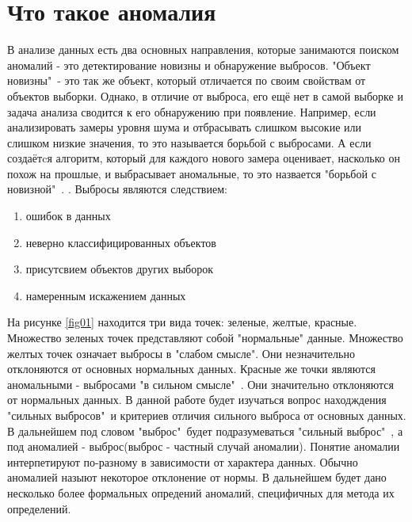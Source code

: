 \section{Что такое аномалия}
В анализе данных есть два основных направления, которые занимаются поиском аномалий - это детектирование новизны и обнаружение выбросов. "Объект новизны"\ - это так же объект, который отличается по своим свойствам от объектов  выборки. Однако, в отличие от выброса,  его ещё нет в самой выборке и задача анализа сводится к его обнаружению при появление. Например, если анализировать замеры уровня шума и отбрасывать слишком высокие или слишком низкие значения, то это называется борьбой с выбросами. А если  создаётcя алгоритм, который для каждого нового замера оценивает, насколько он похож на прошлые, и выбрасывает аномальные, то это  назвается "борьбой с новизной"\ .
\cite{Book01}.
Выбросы являются следствием:
\begin{enumerate}
	\item ошибок в данных
	\item неверно классифицированных объектов
	\item присутсвием объектов других выборок
	\item намеренным искажением данных
\end{enumerate}
На рисунке \ref{fig01} находится три вида точек: зеленые, желтые, красные. Множество зеленых точек представляют собой "нормальные" данные. Множество желтых точек означает  выбросы в "слабом смысле". Они незначительно отклоняются от основных  нормальных данных. Красные же точки являются аномальными - выбросами "в сильном смысле"\ . Они значительно  отклоняются  от нормальных данных. В данной работе будет изучаться вопрос находждения "сильных выбросов"\  и  критериев отличия сильного выброса от основных данных. В дальнейшем под словом "выброс"\ будет подразумеваться "сильный выброс"\ ,  а под  аномалией -  выброс(выброс - частный случай аномалии).
Понятие аномалии  интерпетируют по-разному в зависимости от характера данных. Обычно аномалией назыют некоторое отклонение от нормы. В дальнейшем будет дано несколько более формальных опредений аномалий, специфичных для метода их определений.

